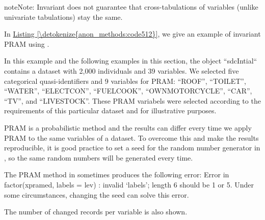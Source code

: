\documentclass[letterpaper,10pt,english]{sphinxmanual}
\begin{document}
\begin{sphinxadmonition}{note}{Note:}
Invariant does not guarantee that
cross-tabulations of variables (unlike univariate tabulations) stay the same.
\end{sphinxadmonition}

In \hyperref[\detokenize{anon_methods:code512}]{Listing \ref{\detokenize{anon_methods:code512}}}, we give an example of invariant PRAM using
. %
\begin{footnote}[11]\sphinxAtStartFootnote
In this example and the following examples in this section, the
 object “sdcIntial“ contains a dataset with 2,000
individuals and 39 variables. We selected five categorical
quasi-identifiers and 9 variables for PRAM: “ROOF”, “TOILET”,
“WATER”, “ELECTCON”, “FUELCOOK”, “OWNMOTORCYCLE”, “CAR”, “TV”, and
“LIVESTOCK”. These PRAM variabels were selected according to the
requirements of this particular dataset and for illustrative
purposes.
%
\end{footnote} PRAM is a probabilistic method and the
results can differ every time we apply PRAM to the same variables of a
dataset. To overcome this and make the results reproducible, it is good
practice to set a seed for the random number generator in , so the
same random numbers will be generated every time. %
\begin{footnote}[12]\sphinxAtStartFootnote
The PRAM method in  sometimes produces the following
error: Error in factor(xpramed, labels = lev) : invalid ‘labels’;
length 6 should be 1 or 5. Under some circumstances, changing the
seed can solve this error.
%
\end{footnote}
The number of changed records per variable is also shown.
\end{document}
